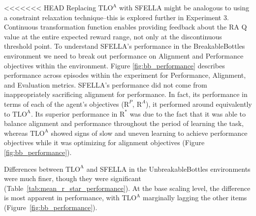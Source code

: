 
<<<<<<< HEAD
Replacing $\text{TLO}^\text{A}$ with SFELLA might be analogous to using a constraint relaxation technique--this is explored further in Experiment 3. %
Continuous transformation function enables providing feedback about the RA Q value at the entire expected reward range, not only at the discontinuous threshold point.
To understand SFELLA's performance in the BreakableBottles environment we need to break out performance on Alignment and Performance objectives within the environment. Figure \ref{fig:bb_performance} describes performance across episodes within the experiment for Performance, Alignment, and Evaluation metrics. SFELLA's performance did not come from inappropriately sacrificing alignment for performance. In fact, its performance in terms of each of the agent's objectives ($\text{R}^P$, $\text{R}^A$), it performed around equivalently to $\text{TLO}^\text{A}$. Its superior performance in $\text{R}^*$ was due to the fact that it was able to balance alignment and performance throughout the period of learning the task, whereas $\text{TLO}^\text{A}$ showed signs of slow and uneven learning to achieve performance objectives while it was optimizing for alignment objectives (Figure \ref{fig:bb_performance}).

Differences between $\text{TLO}^\text{A}$ and SFELLA in the UnbreakableBottles environments were much finer, though they were significant (Table~\ref{tab:mean_r_star_performance}). At the base scaling level, the difference is most apparent in performance, with $\text{TLO}^\text{A}$ marginally lagging the other items (Figure~\ref{fig:bb_performance}). 


